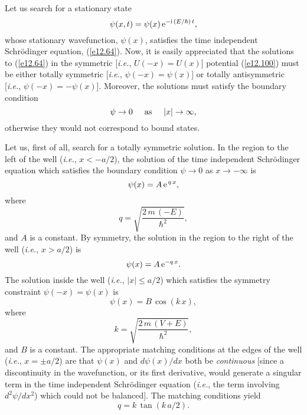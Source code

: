 Let us search for a stationary state 
\begin{equation}
\psi(x,t) = \psi(x)\,{\rm e}^{-{\rm i}\,(E/\hbar)\,t},
\end{equation}
whose stationary wavefunction, $\psi(x)$, satisfies the time independent Schr\"{o}d\-inger equation, 
(\ref{e12.64}). Now, it is easily appreciated that the solutions to (\ref{e12.64}) in the symmetric
 [{\em i.e.}, $U(-x)=U(x)$] potential (\ref{e12.100}) must be either totally
 symmetric [{\em i.e.}, $\psi(-x)=\psi(x)$] or totally antisymmetric [{\em i.e.}, $\psi(-x)=-\psi(x)$]. 
 Moreover, the solutions must satisfy the boundary condition
 \begin{equation}
 \psi\rightarrow 0\mbox{\hspace{0.5cm}as\hspace{0.5cm}$|x|\rightarrow\infty$},
 \end{equation}
 otherwise they would not correspond to bound states.
 
 Let us, first of all, search for a totally symmetric solution. In the region to the left of the well ({\em i.e.}, $x<-a/2$),
 the solution of the time independent Schr\"{o}dinger equation which satisfies the boundary condition
 $\psi\rightarrow 0$ as $x\rightarrow -\infty$ is
 \begin{equation}
 \psi(x) = A\,{\rm e}^{\,q\,x},
 \end{equation}
 where
 \begin{equation}
 q = \sqrt{\frac{2\,m\,(-E)}{\hbar^2}},
 \end{equation}
 and $A$ is a constant. By symmetry, the solution in the region to the right of the well ({\em i.e.}, $x>a/2$)
 is
 \begin{equation}\label{e12.105}
 \psi(x) = A\,{\rm e}^{- q\,x}.
 \end{equation}
 The solution inside the well ({\em i.e.}, $|x|\leq a/2$) which satisfies the symmetry
 constraint $\psi(-x)=\psi(x)$ is
 \begin{equation}\label{e12.106}
 \psi(x) = B\,\cos(k\,x),
 \end{equation}
 where
 \begin{equation}
 k= \sqrt{\frac{2\,m\,(V+E)}{\hbar^2}},
 \end{equation}
 and $B$ is a constant.
 The appropriate matching conditions at the edges of the well ({\em i.e.}, $x=\pm a/2$) are that $\psi(x)$ and $d\psi(x)/dx$
 both be {\em continuous}\/ [since  a discontinuity in the
wavefunction, or  its first derivative, would generate a singular term in the time independent Schr\"{o}dinger equation 
({\em i.e.}, the term involving $d^2\psi/dx^2$) which could not be balanced]. The matching conditions yield
\begin{equation}\label{e12.108}
q = k\,\tan(k\,a/2).
\end{equation}


